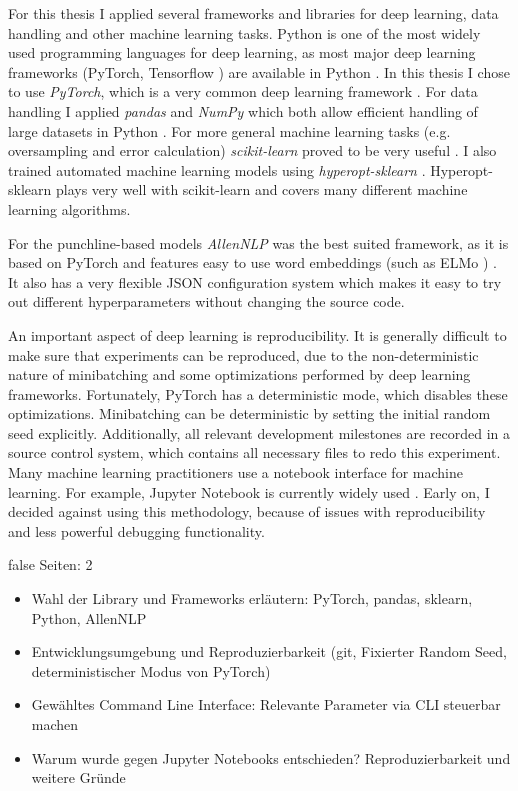 \documentclass[draft,final,oneside]{vutinfth} %
\begin{document}
For this thesis I applied several frameworks and libraries for deep learning, data handling and other machine learning tasks. Python is one of the most widely used programming languages for deep learning, as most major deep learning frameworks (PyTorch, Tensorflow \cite{pytorch}\cite{tensorflow}) are available in Python \cite{python}. In this thesis I chose to use \textit{PyTorch}, which is a very common deep learning framework \cite{pytorch}. For data handling I applied \textit{pandas} and \textit{NumPy} which both allow efficient handling of large datasets in Python \cite{pandas}\cite{numpy}. For more general machine learning tasks (e.g. oversampling and error calculation) \textit{scikit-learn} proved to be very useful \cite{sklearn}. I also trained automated machine learning models using \textit{hyperopt-sklearn} \cite{hyperoptpaper}. Hyperopt-sklearn plays very well with scikit-learn and covers many different machine learning algorithms.


For the punchline-based models \textit{AllenNLP} was the best suited framework, as it is based on PyTorch and features easy to use word embeddings (such as ELMo \cite{elmo}) \cite{allennlp}. It also has a very flexible JSON configuration system which makes it easy to try out different hyperparameters without changing the source code.

An important aspect of deep learning is reproducibility. It is generally difficult to make sure that experiments can be reproduced, due to the non-deterministic nature of minibatching and some optimizations performed by deep learning frameworks. Fortunately, PyTorch has a deterministic mode, which disables these optimizations. Minibatching can be deterministic by setting the initial random seed explicitly. Additionally, all relevant development milestones are recorded in a source control system, which contains all necessary files to redo this experiment. Many machine learning practitioners use a notebook interface for machine learning. For example, Jupyter Notebook is currently widely used \cite{jupyter}. Early on, I decided against using this methodology, because of issues with reproducibility and less powerful debugging functionality.

\if false
Seiten: 2

\begin{itemize}

\item Wahl der Library und Frameworks erläutern: PyTorch, pandas, sklearn, Python, AllenNLP
\item Entwicklungsumgebung und Reproduzierbarkeit (git, Fixierter Random Seed, deterministischer Modus von PyTorch)
\item Gewähltes Command Line Interface: Relevante Parameter via CLI steuerbar machen
\item Warum wurde gegen Jupyter Notebooks entschieden? Reproduzierbarkeit und weitere Gründe

\end{itemize}
\end{document}
